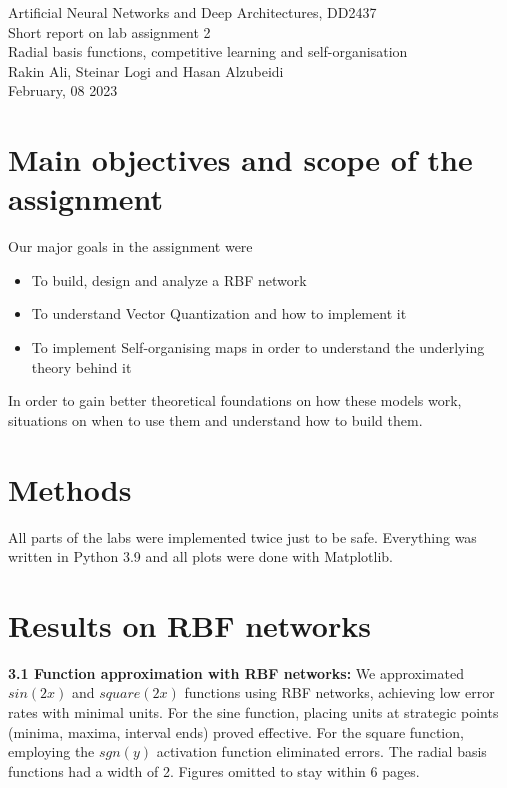\documentclass[a4paper]{article}
\begin{document}
\begin{center}
  {\large Artificial Neural Networks and Deep Architectures, DD2437}\\
  \vspace{7mm}
  {\huge Short report on lab assignment 2\\[1ex]}
  {\Large Radial basis functions, competitive learning and self-organisation}\\
  \vspace{8mm}  
  {\Large Rakin Ali, Steinar Logi and Hasan Alzubeidi}\\
  \vspace{4mm}
  {\large February, 08 2023\\}
\end{center}

\section{Main objectives and scope of the assignment}

Our major goals in the assignment were  
\begin{itemize}
\item To build, design and analyze a RBF network 
\item To understand Vector Quantization and how to implement it  
\item To implement Self-organising maps in order to understand the underlying theory behind it
\end{itemize}
In order to gain better theoretical foundations on how these models work, situations on when to use them and understand how to build them.

\section{Methods} All parts of the labs were implemented twice just to be safe. Everything was written in Python 3.9 and all plots were done with Matplotlib. 
\section{Results on RBF networks}
\textbf{3.1 Function approximation with RBF networks:} We approximated $sin(2x)$ and $square(2x)$ functions using RBF networks, achieving low error rates with minimal units. For the sine function, placing units at strategic points (minima, maxima, interval ends) proved effective. For the square function, employing the $sgn(y)$ activation function eliminated errors. The radial basis functions had a width of 2. Figures omitted to stay within 6 pages.
\end{document}
